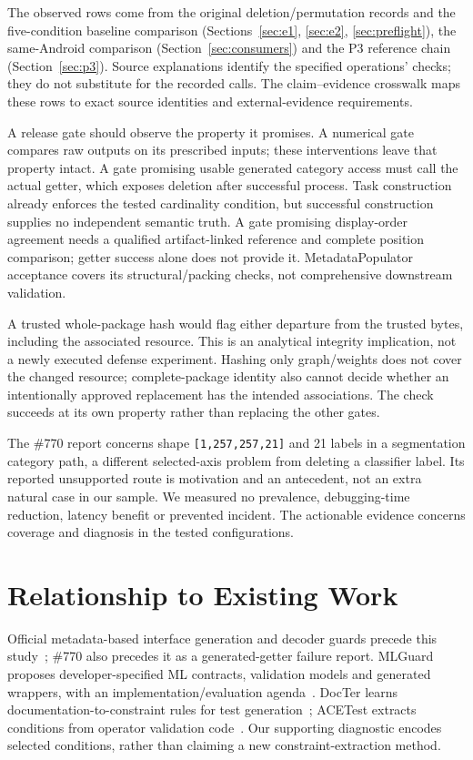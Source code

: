 \documentclass[10pt,conference]{IEEEtran}
\newcommand{\code}[1]{\texttt{#1}}
\begin{document}
The observed rows come from the original deletion/permutation records and the five-condition baseline comparison (Sections~\ref{sec:e1}, \ref{sec:e2}, \ref{sec:preflight}), the same-Android comparison (Section~\ref{sec:consumers}) and the P3 reference chain (Section~\ref{sec:p3}). Source explanations identify the specified operations' checks; they do not substitute for the recorded calls. The claim--evidence crosswalk maps these rows to exact source identities and external-evidence requirements.

A release gate should observe the property it promises. A numerical gate compares raw outputs on its prescribed inputs; these interventions leave that property intact. A gate promising usable generated category access must call the actual getter, which exposes deletion after successful process. Task construction already enforces the tested cardinality condition, but successful construction supplies no independent semantic truth. A gate promising display-order agreement needs a qualified artifact-linked reference and complete position comparison; getter success alone does not provide it. MetadataPopulator acceptance covers its structural/packing checks, not comprehensive downstream validation.

A trusted whole-package hash would flag either departure from the trusted bytes, including the associated resource. This is an analytical integrity implication, not a newly executed defense experiment. Hashing only graph/weights does not cover the changed resource; complete-package identity also cannot decide whether an intentionally approved replacement has the intended associations. The check succeeds at its own property rather than replacing the other gates.

The \#770 report concerns shape \code{[1,257,257,21]} and 21 labels in a segmentation category path, a different selected-axis problem from deleting a classifier label. Its reported unsupported route is motivation and an antecedent, not an extra natural case in our sample. We measured no prevalence, debugging-time reduction, latency benefit or prevented incident. The actionable evidence concerns coverage and diagnosis in the tested configurations.

\section{Relationship to Existing Work}
\label{sec:related}
Official metadata-based interface generation and decoder guards precede this study~\cite{codegen-doc,tensorlabel}; \#770 also precedes it as a generated-getter failure report. MLGuard proposes developer-specified ML contracts, validation models and generated wrappers, with an implementation/evaluation agenda~\cite{mlguard}. DocTer learns documentation-to-constraint rules for test generation~\cite{docter}; ACETest extracts conditions from operator validation code~\cite{acetest}. Our supporting diagnostic encodes selected conditions, rather than claiming a new constraint-extraction method.
\end{document}
